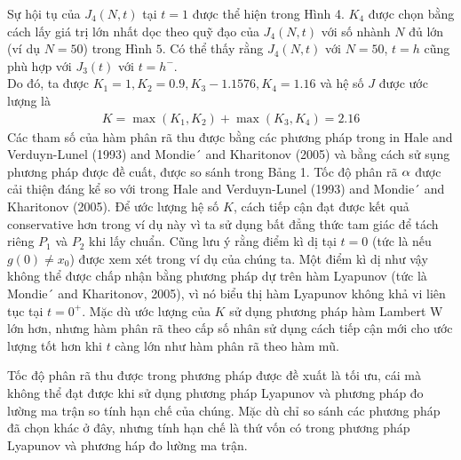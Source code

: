 \begin{vd}
Sự hội tụ của $J_4(N,t)$ tại $t =1$ được thể hiện trong Hình 4. $K_4$ được chọn bằng cách lấy giá trị lớn nhất dọc theo quỹ đạo của $J_4(N,t)$ với số nhành $N$ đủ lớn (ví dụ $N = 50$) trong Hình $5$. Có thể thấy rằng $J_4(N,t)$ với $N = 50$, $t =h$ cũng phù 
hợp với $J_3(t)$ với $t = h^-$.\\
Do đó, ta được $K_1 =1, K_2=0.9, K_3 - 1.1576, K_4 = 1.16$ và hệ số $J$ được ước lượng là
\begin{align*}
	K = \max(K_1,K_2) + \max(K_3,K_4) = 2.16
\end{align*}
Các tham số của hàm phân rã thu được bằng các phương pháp trong in Hale and Verduyn-Lunel (1993) and Mondie´ and Kharitonov (2005) và bằng cách sử sụng phương pháp được đề cuất, được so sánh trong Bảng 1. Tốc độ phân rã $\alpha$ được cải thiện đáng kể so với trong Hale and Verduyn-Lunel (1993) and Mondie´ and Kharitonov (2005). Để ước lượng hệ số $K$, cách tiếp cận đạt được kết quả conservative hơn trong ví dụ này vì ta sử dụng bất đẳng thức tam giác để tách riêng $P_1$ và $P_2$ khi lấy chuẩn. Cũng lưu ý rằng điểm kì dị tại $t=0$ (tức là nếu $g(0) \ne x_0$) được xem xét trong ví dụ của chúng ta. Một điểm kì dị như vậy không thể được chấp nhận bằng phương pháp dự trên hàm Lyapunov (tức là Mondie´ and Kharitonov, 2005), vì nó biểu thị hàm Lyapunov không khả vi liên tục tại $ t = 0^+$. Mặc dù ước lượng của $K$ sử dụng phương pháp hàm Lambert W lớn hơn, nhưng hàm phân rã theo cấp số nhân sử dụng cách tiếp cận mới cho ước lượng tốt hơn khi $t$ càng lớn như hàm phân rã theo hàm mũ.
\end{vd}
\begin{nx}
	Tốc độ phân rã thu được trong phương pháp được đề xuất là tối ưu, cái mà không thể đạt được khi sử dụng phương pháp Lyapunov và phương pháp đo lường ma trận so tính hạn chế  của chúng. Mặc dù chỉ so sánh các phương pháp đã chọn khác ở đây, nhưng tính hạn chế  là thứ vốn có trong phương pháp Lyapunov và phương háp đo lường ma trận. 
\end{nx}
